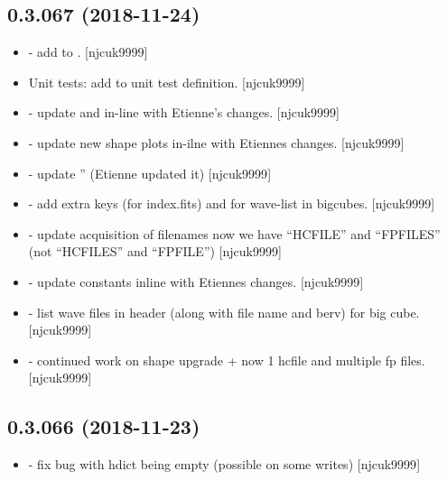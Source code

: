 \documentclass[a4paper,10pt,english]{report}
\begin{document}
\subsection{0.3.067 (2018-11-24)}
\label{\detokenize{misc/changelog:id255}}\begin{itemize}
\item {} 
 - add  to . {[}njcuk9999{]}

\item {} 
Unit tests: add  to unit test definition. {[}njcuk9999{]}

\item {} 
 - update  and  in-line with
Etienne’s changes. {[}njcuk9999{]}

\item {} 
 - update new shape plots in-ilne with Etiennes changes.
{[}njcuk9999{]}

\item {} 
 - update ” (Etienne updated it) {[}njcuk9999{]}

\item {} 
 - add extra keys (for index.fits) and for wave-list
in bigcubes. {[}njcuk9999{]}

\item {} 
 - update acquisition of filenames now we have “HCFILE”
and “FPFILES” (not “HCFILES” and “FPFILE”) {[}njcuk9999{]}

\item {} 
 - update constants inline with Etiennes
changes. {[}njcuk9999{]}

\item {} 
 - list wave files in header (along with file
name and berv) for big cube. {[}njcuk9999{]}

\item {} 
 - continued work on shape upgrade + now 1 hcfile
and multiple fp files. {[}njcuk9999{]}

\end{itemize}


\subsection{0.3.066 (2018-11-23)}
\label{\detokenize{misc/changelog:id256}}\begin{itemize}
\item {} 
 - fix bug with hdict being empty (possible on some
writes) {[}njcuk9999{]}

\end{itemize}
\end{document}
